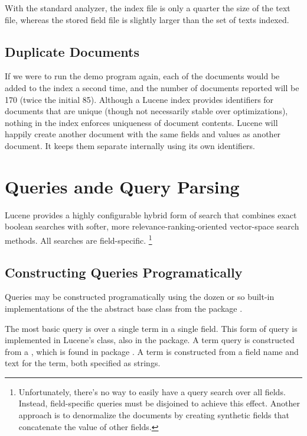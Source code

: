 With the standard analyzer, the index file is only a quarter the size of
the text file, whereas the stored field file is slightly larger than the
set of texts indexed.

\subsection{Duplicate Documents}

If we were to run the demo program again, each of the documents would
be added to the index a second time, and the number of documents
reported will be 170 (twice the initial 85).  Although a Lucene index
provides identifiers for documents that are unique (though not
necessarily stable over optimizations), nothing in the index enforces
uniqueness of document contents.  Lucene will happily create another
document with the same fields and values as another document.  It
keeps them separate internally using its own identifiers.


\section{Queries ande Query Parsing}

Lucene provides a highly configurable hybrid form of search that
combines exact boolean searches with softer, more
relevance-ranking-oriented vector-space search methods.  All searches
are field-specific.
%
\footnote{Unfortunately, there's no way to easily have a query search
  over all fields.  Instead, field-specific queries must be disjoined
  to achieve this effect.  Another approach is to denormalize the
  documents by creating synthetic fields that concatenate the value of
  other fields.}

\subsection{Constructing Queries Programatically}

Queries may be constructed programatically using the dozen or so
built-in implementations of the the  abstract base class
from the package .  

The most basic query is over a single term in a single field.  This
form of query is implemented in Lucene's  class, also
in the  package.  A term query is constructed from a
, which is found in package .
A term is constructed from a field name and text for the term, both
specified as strings.

